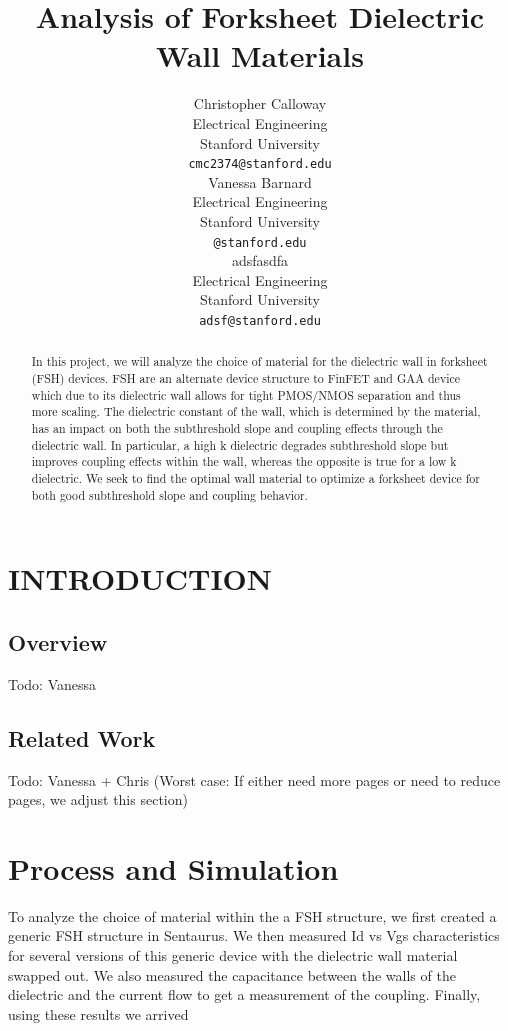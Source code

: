 \documentclass[letterpaper, 12 pt, conference]{ieeeconf}  %
\title{\LARGE \bf
Analysis of Forksheet Dielectric Wall Materials
}
\author{ \parbox{3 in}{\centering Christopher Calloway \\
        Electrical Engineering\\
        Stanford University\\
        {\tt\small cmc2374@stanford.edu}}
        \hspace*{ 0.5 in}
        \parbox{3 in}{ \centering Vanessa Barnard\\
        Electrical Engineering \\
        Stanford University\\
        {\tt\small @stanford.edu}}
          \hspace*{ 0.5 in}
        \parbox{3 in}{ \centering adsfasdfa\\
        Electrical Engineering \\
        Stanford University\\
        {\tt\small adsf@stanford.edu}}
}
\begin{document}
\maketitle
\thispagestyle{empty}
\pagestyle{empty}


\begin{abstract}

In this project, we will analyze the choice of material for the dielectric wall in forksheet (FSH) devices. FSH are an alternate device structure to FinFET and GAA device which due to its dielectric wall allows for tight PMOS/NMOS separation and thus more scaling. The dielectric constant of the wall, which is determined by the material, has an impact on both the subthreshold slope and coupling effects through the dielectric wall. In particular, a high k dielectric degrades subthreshold slope but improves coupling effects within the wall, whereas the opposite is true for a low k dielectric. We seek to find the optimal wall material to optimize a forksheet device for both good subthreshold slope and coupling behavior. 


\end{abstract}


\section{INTRODUCTION}

\subsection{Overview}


Todo: Vanessa



\subsection{Related Work}

Todo: Vanessa + Chris (Worst case: If either need more pages or need to reduce pages, we adjust this section)



\section{Process and Simulation}

To analyze the choice of material within the a FSH structure, we first created a generic FSH structure in Sentaurus. We then measured Id vs Vgs characteristics for several versions of this generic device with the dielectric wall material swapped out. We also measured the capacitance between the walls of the dielectric and the current flow to get a measurement of the coupling. Finally, using these results we arrived 
\end{document}
